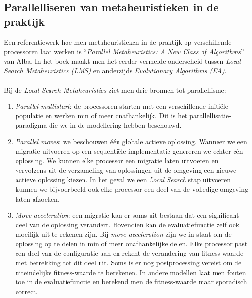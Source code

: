\subsection{Parallelliseren van metaheuristieken in de praktijk}

Een referentiewerk hoe men metaheuristieken in de praktijk op verschillende processoren laat werken is ``\emph{Parallel Metaheuristics: A New Class of Algorithms}'' van Alba\cite{Alba2005book}. In het boek maakt men het eerder vermelde onderscheid tussen \emph{Local Search Metaheuristics (LMS)} en anderzijds \emph{Evolutionary Algorithms (EA)}.
\paragraph{}
Bij de \emph{Local Search Metaheuristics} ziet men drie bronnen tot parallellisme:
\begin{enumerate}
 \item \emph{Parallel multistart}: de processoren starten met een verschillende initi\"ele populatie en werken min of meer onafhankelijk. Dit is het parallellisatie-paradigma die we in de modellering hebben beschouwd.
 \item \emph{Parallel moves}: we beschouwen \'e\'en globale actieve oplossing. Wanneer we een migratie uitvoeren op een sequenti\"ele implementatie genereren we echter \'e\'en oplossing. We kunnen elke processor een migratie laten uitvoeren en vervolgens uit de verzameling van oplossingen uit de omgeving een nieuwe actieve oplossing kiezen. In het geval we een \emph{Local Search} stap uitvoeren kunnen we bijvoorbeeld ook elke processor een deel van de volledige omgeving laten afzoeken.
 \item \emph{Move acceleration}: een migratie kan er soms uit bestaan dat een significant deel van de oplossing verandert. Bovendien kan de evaluatiefunctie zelf ook moeilijk uit te rekenen zijn. Bij \emph{move acceleration} zijn we in staat om de oplossing op te delen in min of meer onafhankelijke delen. Elke processor past een deel van de configuratie aan en rekent de verandering van fitness-waarde met betrekking tot dit deel uit. Soms is er nog postprocessing vereist om de uiteindelijke fitness-waarde te berekenen. In andere modellen laat men fouten toe in de evaluatiefunctie en berekend men de fitness-waarde maar sporadisch correct.
\end{enumerate}

